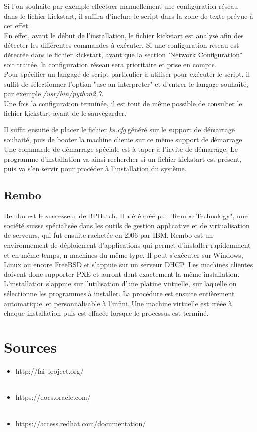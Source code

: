 \documentclass[a4paper,12pt,one side,titlepage]{report}
\begin{document}
\vspace{1em}
Si l'on souhaite par exemple effectuer manuellement une configuration réseau dans le fichier kickstart, il suffira d'inclure le script dans la zone de texte prévue à cet effet.\\
En effet, avant le début de l'installation, le fichier kickstart est analysé afin des détecter les différentes commandes à exécuter. Si une configuration réseau est détectée dans le fichier kickstart, avant que la section "Network Configuration" soit traitée, la configuration réseau sera prioritaire et prise en compte.\\
Pour spécifier un langage de script particulier à utiliser pour exécuter le script, il suffit de sélectionner l'option "use an interpreter" et d'entrer le langage souhaité, par exemple \textit{/usr/bin/python2.7}.\\

Une fois la configuration terminée, il est tout de même possible de consulter le fichier kickstart avant de le sauvegarder.

Il suffit ensuite de placer le fichier \textit{ks.cfg} généré sur le support de démarrage souhaité, puis de booter la machine cliente sur ce même support de démarrage. Une commande de démarrage spéciale est à taper à l'invite de démarrage. Le programme d'installation va ainsi rechercher si un fichier kickstart est présent, puis va s'en servir pour procéder à l'installation du système.

\section{Rembo}
Rembo est le successeur de BPBatch. Il a été créé par "Rembo Technology", une société suisse spécialisée dans les outils de gestion applicative et de virtualisation de serveurs, qui fut ensuite rachetée en 2006 par IBM. Rembo est un environnement de déploiement d'applications qui permet d'installer rapidemment et en même temps, n machines du même type. Il peut s’exécuter sur Windows, Linux ou encore FreeBSD et s’appuie sur un serveur DHCP. Les machines clientes doivent donc supporter PXE et auront dont exactement la même installation.\\

L'installation s'appuie sur l'utilisation d'une platine virtuelle, sur laquelle on sélectionne les programmes à installer. La procédure est ensuite entièrement automatique, et personnalisable à l'infini. Une machine virtuelle est créée à chaque installation puis est effacée lorsque le processus est terminé.

\chapter{Sources}
\begin{itemize}
  \item http://fai-project.org/\\\\
  \item https://docs.oracle.com/\\\\
  \item https://access.redhat.com/documentation/\\\\
\end{itemize}
\end{document}
